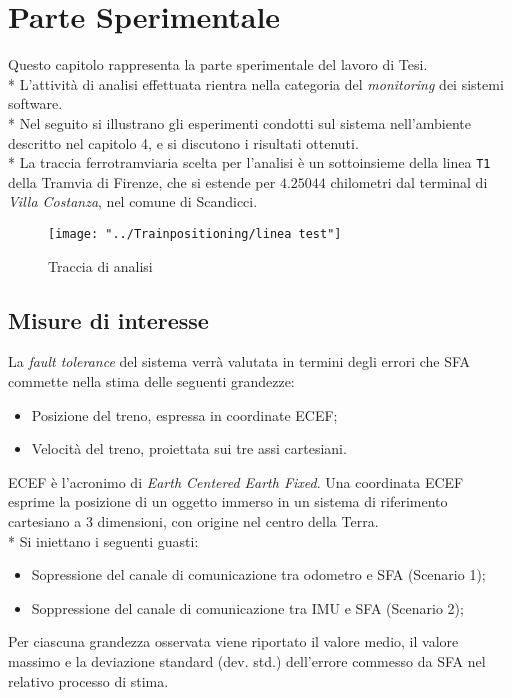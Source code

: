 \chapter{Parte Sperimentale}
Questo capitolo rappresenta la parte sperimentale del lavoro di Tesi.\\*
L'attivit\`a di analisi effettuata rientra nella categoria del \emph{monitoring} dei sistemi software.\\*
Nel seguito si illustrano gli esperimenti condotti sul sistema nell'ambiente descritto nel capitolo 4, e si discutono i risultati ottenuti.\\*
La traccia ferrotramviaria scelta per l'analisi \`e un sottoinsieme della linea \texttt{T1} della Tramvia di Firenze, che si estende per $4.25044$ chilometri dal terminal di \emph{Villa Costanza}, nel comune di Scandicci. 
\begin{figure}[h]
	\centering
	\texttt{[image: "../Trainpositioning/linea test"]}
	\caption{Traccia di analisi}
	\label{fig:linea-test}
\end{figure}
\section{Misure di interesse}
La \emph{fault tolerance} del sistema verr\`a valutata in termini degli errori che SFA commette nella stima delle seguenti grandezze:
\begin{itemize}
	\item Posizione del treno, espressa in coordinate ECEF;
	\item Velocit\`a del treno, proiettata sui tre assi cartesiani.
\end{itemize}
ECEF \`e l'acronimo di \emph{Earth Centered Earth Fixed}. Una coordinata ECEF esprime la posizione di un oggetto immerso in un sistema di riferimento cartesiano a 3 dimensioni, con origine nel centro della Terra.\\*
Si iniettano i seguenti guasti:
\begin{itemize}
	\item Sopressione del canale di comunicazione tra odometro e SFA (Scenario 1);
	\item Soppressione del canale di comunicazione tra IMU e SFA (Scenario 2);
\end{itemize}
Per ciascuna grandezza osservata viene riportato il valore medio, il valore
massimo e la deviazione standard (dev. std.) dell'errore commesso da SFA nel relativo processo di stima.
